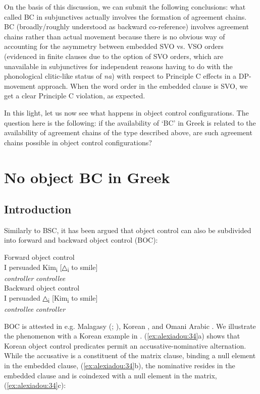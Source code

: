 \documentclass[output=paper]{langsci/langscibook}
\begin{document}
On the basis of this discussion, we can submit the following conclusions: what \citet{Alexiadou2010} called BC in subjunctives actually involves the formation of agreement chains. BC (broadly\slash roughly understood as backward co-reference) involves agreement chains rather than actual movement because there is no obvious way of accounting for the asymmetry between embedded SVO vs. VSO orders (evidenced in finite clauses due to the option of SVO orders, which are unavailable in subjunctives for independent reasons having to do with the phonological clitic-like status of \textit{na}) with respect to Principle C effects in a DP-movement approach. When the word order in the embedded clause is SVO, we get a clear Principle C violation, as expected.

In this light, let us now see what happens in object control configurations. The question here is the following: if the availability of ‘BC’ in Greek is related to the availability of agreement chains of the type described above, are such agreement chains possible in object control configurations?

\section{No object BC in Greek} 

\subsection{Introduction}
Similarly to BSC, it has been argued that object control can also be subdivided into forward and backward object control (BOC):

\ea%
    \label{ex:alexiadou:33}
    \ea Forward object control\\
    \gll I persuaded   Kim\textsubscript{i}     [{△\textsubscript{i}} to smile]  \\
         {}   {}       \textit{controller}         \textit{controllee}\\
    \ex Backward object control\\
    \gll I persuaded  △\textsubscript{i}    [Kim\textsubscript{i}    to smile]  \\
        {}    {}       \textit{controllee}  \textit{controller}\\
        \z
\z

BOC is attested in e.g. Malagasy (\citealt{Potsdam2006Backward}; \citeyear{Potsdam2009}), Korean \citep{Monahan2003}, and Omani Arabic \citep{Al-Balushi2008}. We illustrate the phenomenon with a Korean example in . (\ref{ex:alexiadou:34}a) shows that Korean object control predicates permit an accusative-nominative alternation. While the accusative is a constituent of the matrix clause, binding a null element in the embedded clause, (\ref{ex:alexiadou:34}b), the nominative resides in the embedded clause and is coindexed with a null element in the matrix, (\ref{ex:alexiadou:34}c):
 
\end{document}
